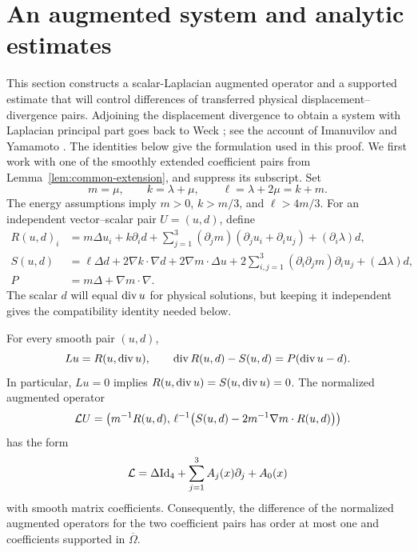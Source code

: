 \section{An augmented system and analytic estimates}
\label{sec:analytic-estimates}

This section constructs a scalar-Laplacian augmented operator and a
supported estimate that will control differences of transferred physical
displacement--divergence pairs.
Adjoining the displacement divergence to obtain a system with Laplacian
principal part goes back to Weck \cite{Weck1969}; see the account of
Imanuvilov and Yamamoto \cite[Section~1]{ImanuvilovYamamoto2004Carleman}.
The identities below give the formulation used in this proof.
We first work with one of the smoothly extended coefficient pairs from
Lemma~\ref{lem:common-extension}, and suppress its subscript. Set
\[
 m=\mu,\qquad k=\lambda+\mu,\qquad \ell=\lambda+2\mu=k+m.
\]
The energy assumptions imply $m>0$, $k>m/3$, and $\ell>4m/3$.
For an independent vector--scalar pair $U=(u,d)$, define
\begin{equation}
\label{eq:augmented-operators}
\begin{aligned}
 R(u,d)_i
  & =m\Delta u_i+k\partial_i d
   +\sum_{j=1}^3(\partial_jm)(\partial_ju_i+\partial_iu_j)
   +(\partial_i\lambda)d,\\
 S(u,d)
  & =\ell\Delta d+2\nabla k\cdot\nabla d
   +2\nabla m\cdot\Delta u
   +2\sum_{i,j=1}^3(\partial_i\partial_jm)\partial_iu_j
   +(\Delta\lambda)d,\\
 P&=m\Delta+\nabla m\cdot\nabla.
\end{aligned}
\end{equation}
The scalar $d$ will equal $\operatorname{div} u$ for physical solutions, but keeping
it independent gives the compatibility identity needed below.

\begin{lemma}
\label{lem:augmented-system}
For every smooth pair $(u,d)$,
\begin{equation}
\label{eq:augmented-identity}
 Lu=R(u,\operatorname{div} u),\qquad
 \operatorname{div} R(u,d)-S(u,d)=P(\operatorname{div} u-d).
\end{equation}
In particular, $Lu=0$ implies $R(u,\operatorname{div} u)=S(u,\operatorname{div} u)=0$.
The normalized augmented operator
\begin{equation}
\label{eq:normalized-augmented}
 \mathcal L U=
 \left(m^{-1}R(u,d),\,
 \ell^{-1}\bigl(S(u,d)-2m^{-1}\nabla m\cdot R(u,d)\bigr)\right)
\end{equation}
has the form
\begin{equation}
\label{eq:laplace-principal-form}
 \mathcal L=\Delta\mathrm{Id}_4+\sum_{j=1}^3 A_j(x)\partial_j+A_0(x)
\end{equation}
with smooth matrix coefficients. Consequently, the difference of the
normalized augmented operators for the two coefficient pairs has order
at most one and coefficients supported in $\overline\Omega$.
\end{lemma}

